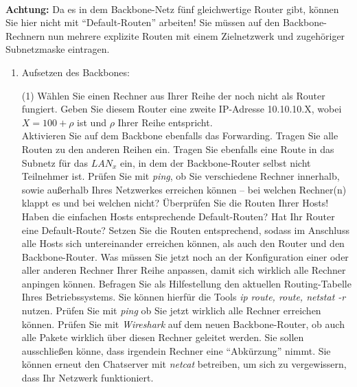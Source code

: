 \documentclass[paper=a4,fontsize=11pt]{scrartcl}%
\numberwithin{equation}{section}
\begin{document}
\vskip0.05in ~\\
\textbf{Achtung:} Da es in dem Backbone-Netz fünf gleichwertige Router gibt, können Sie hier nicht mit \enquote{Default-Routen} arbeiten! Sie müssen auf den Backbone-Rechnern nun mehrere explizite Routen mit einem Zielnetzwerk und zugehöriger Subnetzmaske eintragen.
\begin{enumerate}
	\item Aufsetzen des Backbones:
	\begin{tasks}(1)
		\task Wählen Sie einen Rechner aus Ihrer Reihe der noch nicht als Router fungiert. Geben Sie diesem Router eine zweite IP-Adresse 10.10.10.X, wobei $X=100 + \rho$ ist und $\rho$ Ihrer Reihe entspricht.\\
		\task Aktivieren Sie auf dem Backbone ebenfalls das Forwarding.
		\task Tragen Sie alle Routen zu den anderen Reihen ein. Tragen Sie ebenfalls eine Route in das Subnetz für das $LAN_x$ ein, in dem der Backbone-Router selbst nicht Teilnehmer ist.
		\task Prüfen Sie mit \emph{ping}, ob Sie verschiedene Rechner innerhalb, sowie außerhalb Ihres Netzwerkes erreichen können -- bei welchen Rechner(n) klappt es und bei welchen nicht?
		\task Überprüfen Sie die Routen Ihrer Hosts! Haben die einfachen Hosts entsprechende Default-Routen? Hat Ihr Router eine Default-Route? Setzen Sie die Routen entsprechend, sodass im Anschluss alle Hosts sich untereinander erreichen können, als auch den Router und den Backbone-Router.
		\task Was müssen Sie jetzt noch an der Konfiguration einer oder aller anderen Rechner Ihrer Reihe anpassen, damit sich wirklich alle Rechner anpingen können.
		\task Befragen Sie als Hilfestellung den aktuellen Routing-Tabelle Ihres Betriebssystems. Sie können hierfür die Tools \emph{ip route, route, netstat -r} nutzen.
		\task Prüfen Sie mit \emph{ping} ob Sie jetzt wirklich alle Rechner erreichen können.
		\task Prüfen Sie mit \emph{Wireshark} auf dem neuen Backbone-Router, ob auch alle Pakete wirklich über diesen Rechner geleitet werden. Sie sollen ausschließen könne, dass irgendein Rechner eine \enquote{Abkürzung} nimmt.
		\task Sie können erneut den Chatserver mit \emph{netcat} betreiben, um sich zu vergewissern, dass Ihr Netzwerk funktioniert.
	\end{tasks}
\end{enumerate}
\end{document}
